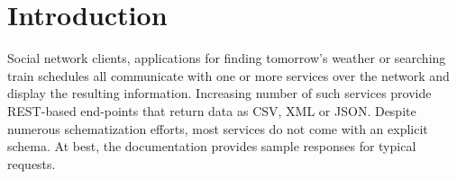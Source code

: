 \documentclass[10pt,preprint,blind,clearpagebib]{sigplanconf}
\begin{document}
%
%

\section{Introduction}
\label{sec:introduction}

Social network clients, applications for finding tomorrow's weather or searching train schedules
all communicate with one or more services over the network and display the resulting information. 
Increasing number of such services provide REST-based end-points that return data as CSV, XML
or JSON. Despite numerous schematization efforts, most services do not come with an 
explicit schema. At best, the documentation provides sample responses for typical requests.
\end{document}

